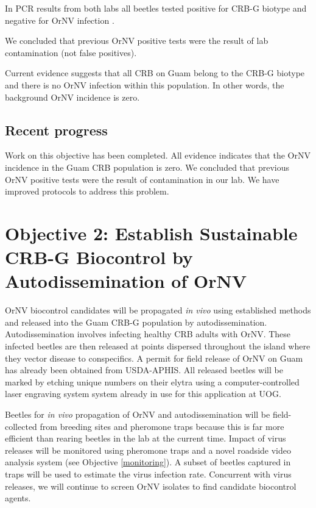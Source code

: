 \documentclass[12pt,letterpaper,english,bibliography=totocnumbered, abstract=on]{scrartcl}
\begin{document}
In PCR results from both labs all beetles tested positive for CRB-G biotype and negative for OrNV infection \cite{graselaInvestigationDeterminePresence2020}. 

We concluded that previous OrNV positive tests were the result of lab contamination (not false positives). 

Current evidence suggests that all CRB on Guam belong to the CRB-G biotype and there is no OrNV infection within this population. In other words, the background OrNV incidence is zero.

\subsection{Recent progress}

Work on this objective has been completed. All evidence indicates that the OrNV incidence in the Guam CRB population is zero. We concluded that previous OrNV positive tests were the result of contamination in our lab. We have improved protocols to address this problem.

\clearpage
\section{Objective 2: Establish Sustainable CRB-G Biocontrol by Autodissemination of OrNV}

\begin{framed}
		
OrNV biocontrol candidates will be propagated \textit{in vivo} using established methods \cite{huger_oryctes_2005-1} and released into the Guam CRB-G population by autodissemination. Autodissemination involves infecting healthy CRB adults with OrNV. These infected beetles are then released at points dispersed throughout the island where they vector disease to conspecifics. A permit for field release of OrNV on Guam has already been obtained from USDA-APHIS. All released beetles will be marked by etching unique numbers on their elytra using a computer-controlled laser engraving system system already in use for this application at UOG.

Beetles for \textit{in vivo} propagation of OrNV and autodissemination will be field-collected from breeding sites and pheromone traps because this is far more efficient than rearing beetles in the lab at the current time. Impact of virus releases will be monitored using pheromone traps and a novel roadside video analysis system (see Objective \ref{monitoring}). A subset of beetles captured in traps will be used to estimate the virus infection rate. Concurrent with virus releases, we will continue to screen OrNV isolates to find candidate biocontrol agents.
\end{framed}
\end{document}
